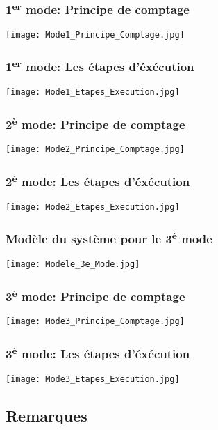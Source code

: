 \documentclass{beamer}
\begin{document}
\begin{frame}
\frametitle{1\textsuperscript{er} mode: Principe de comptage}
\centering
    \texttt{[image: Mode1\_Principe\_Comptage.jpg]}
\end{frame}

\begin{frame}
\frametitle{1\textsuperscript{er} mode: Les étapes d'éxécution}
\centering
    \texttt{[image: Mode1\_Etapes\_Execution.jpg]}
\end{frame}

\begin{frame}
\frametitle{2\textsuperscript{è} mode: Principe de comptage}
\centering
    \texttt{[image: Mode2\_Principe\_Comptage.jpg]}
\end{frame}

\begin{frame}
\frametitle{2\textsuperscript{è} mode: Les étapes d'éxécution}
\centering
    \texttt{[image: Mode2\_Etapes\_Execution.jpg]}
\end{frame}

\begin{frame}
\frametitle{Modèle du système pour le 3\textsuperscript{è} mode}
\centering
    \texttt{[image: Modele\_3e\_Mode.jpg]}
\end{frame}

\begin{frame}
\frametitle{ 3\textsuperscript{è} mode: Principe de comptage}
\centering
    \texttt{[image: Mode3\_Principe\_Comptage.jpg]}
\end{frame}

\begin{frame}
\frametitle{ 3\textsuperscript{è} mode: Les étapes d'éxécution}
\centering
    \texttt{[image: Mode3\_Etapes\_Execution.jpg]}
\end{frame}


\subsection{Remarques} %
\end{document}
